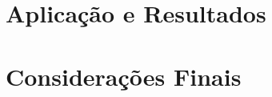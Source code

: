\documentclass{./public/ufpatcc}
\begin{document}
\chapter{Aplicação e Resultados}
%

\chapter{Considerações Finais}
%

\renewcommand\bibname{Referências Bibliográficas}



\clearpage

\end{document}
